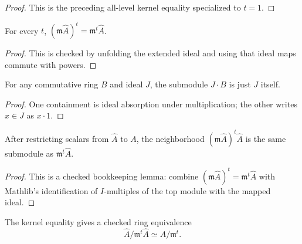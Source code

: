 \begin{proof}
  This is the preceding all-level kernel equality specialized to \(t=1\).
\end{proof}

\begin{lemma}
  \label{lem:adic_completion_power_image_one_pow}
  For every \(t\), \((\mathfrak m\widehat A)^t=\mathfrak m^t\widehat A\).
\end{lemma}

\begin{proof}
  This is checked by unfolding the extended ideal and using that ideal maps
  commute with powers.
\end{proof}

\begin{lemma}
  \label{lem:ideal_smul_top_eq_self}
  For any commutative ring \(B\) and ideal \(J\), the submodule
  \(J\cdot B\) is just \(J\) itself.
\end{lemma}

\begin{proof}
  One containment is ideal absorption under multiplication; the other writes
  \(x\in J\) as \(x\cdot 1\).
\end{proof}

\begin{lemma}
  \label{lem:adic_completion_power_image_one_pow_smul_top_restrict_scalars}
  After restricting scalars from \(\widehat A\) to \(A\), the neighborhood
  \((\mathfrak m\widehat A)^t\widehat A\) is the same submodule as
  \(\mathfrak m^t\widehat A\).
\end{lemma}

\begin{proof}
  This is a checked bookkeeping lemma: combine
  \((\mathfrak m\widehat A)^t=\mathfrak m^t\widehat A\) with Mathlib's
  identification of \(I\)-multiples of the top module with the mapped ideal.
\end{proof}

\begin{definition}
  \label{def:adic_completion_quotient_power_image_equiv}
  The kernel equality gives a checked ring equivalence
  \[
    \widehat A/\mathfrak m^t\widehat A \simeq A/\mathfrak m^t.
  \]
\end{definition}

